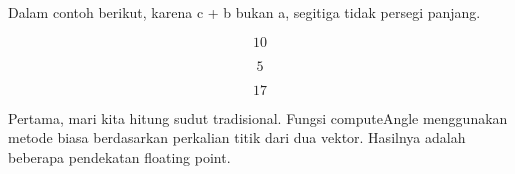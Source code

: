 \documentclass[12pt,arial,letterpaper]{book}
\begin{document}
\begin{eulernootebook}
\begin{eulercomment}
\begin{eulercomment}
\begin{eulernootebook}
\begin{eulercomment}
\begin{eulercomment}
\begin{eulercomment}
\begin{eulercomment}
\begin{eulercomment}
\begin{eulercomment}
\begin{eulernotebook}
\begin{eulercomment}
\begin{eulercomment}
\begin{eulercomment}
\begin{eulercomment}
\begin{eulercomment}
Dalam contoh berikut, karena c + b bukan a, segitiga tidak persegi
panjang.
\end{eulercomment}
\begin{eulerformula}
\[
10
\]
\end{eulerformula}
\begin{eulerformula}
\[
5
\]
\end{eulerformula}
\begin{eulerformula}
\[
17
\]
\end{eulerformula}
\begin{eulercomment}
Pertama, mari kita hitung sudut tradisional. Fungsi computeAngle
menggunakan metode biasa berdasarkan perkalian titik dari dua vektor.
Hasilnya adalah beberapa pendekatan floating point.



\end{eulercomment}
\end{eulercomment}
\end{eulercomment}
\end{eulercomment}
\end{eulercomment}
\end{eulernotebook}
\end{eulercomment}
\end{eulercomment}
\end{eulercomment}
\end{eulercomment}
\end{eulercomment}
\end{eulercomment}
\end{eulernootebook}
\end{eulercomment}
\end{eulercomment}
\end{eulernootebook}
\end{document}
